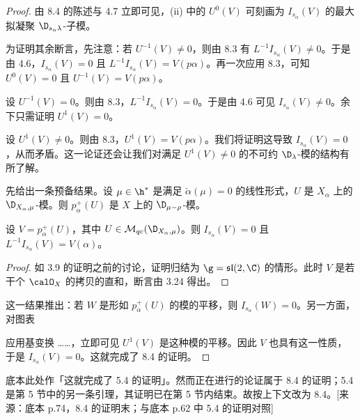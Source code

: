 \begin{proof}
由 8.4 的陈述与 4.7 立即可见，(ii) 中的 $U^0(V)$ 可刻画为 $I_{s_\alpha}(V)$ 的最大拟凝聚 $\D_{s_\alpha\lambda}$-子模。

为证明其余断言，先注意：若 $U^{-1}(V)\ne0$，则由 8.3 有 $L^{-1}I_{s_\alpha}(V)\ne0$。于是由 4.6，$I_{s_\alpha}(V)=0$ 且 $L^{-1}I_{s_\alpha}(V)=V(p\alpha)$。再一次应用 8.3，可知 $U^0(V)=0$ 且 $U^{-1}(V)=V(p\alpha)$。

设 $U^{-1}(V)=0$。则由 8.3，$L^{-1}I_{s_\alpha}(V)=0$。于是由 4.6 可见 $I_{s_\alpha}(V)\ne0$。余下只需证明 $U^1(V)=0$。

设 $U^1(V)\ne0$。则由 8.3，$U^1(V)=V(p\alpha)$。我们将证明这导致 $I_{s_\alpha}(V)=0$，从而矛盾。这一论证还会让我们对满足 $U^1(V)\ne0$ 的不可约 $\D_\lambda$-模的结构有所了解。

先给出一条预备结果。设 $\mu\in\h^*$ 是满足 $\check\alpha(\mu)=0$ 的线性形式，$U$ 是 $X_\alpha$ 上的 $\D_{X_\alpha,\mu}$-模。则 $p_\alpha^+(U)$ 是 $X$ 上的 $\D_{\mu-\rho}$-模。

\begin{lemma}\label{lem:03.8.5}
设 $V=p_\alpha^+(U)$，其中 $U\in\mathcal{M}_{qc}(\D_{X_\alpha,\mu})$。则 $I_{s_\alpha}(V)=0$ 且 $L^{-1}I_{s_\alpha}(V)=V(\alpha)$。
\end{lemma}

\begin{proof}
如 3.9 的证明之前的讨论，证明归结为 $\g=\mathfrak{sl}(2,\C)$ 的情形。此时 $V$ 是若干个 $\calO_X$ 的拷贝的直和，断言由 3.24 得出。
\end{proof}

这一结果推出：若 $W$ 是形如 $p_\alpha^+(U)$ 的模的平移，则 $I_{s_\alpha}(W)=0$。另一方面，对图表
\begin{center}
{\small{}}
\end{center}
应用基变换 ……，立即可见 $U^1(V)$ 是这种模的平移。因此 $V$ 也具有这一性质，于是 $I_{s_\alpha}(V)=0$。这就完成了 8.4 的证明。
\end{proof}

\begin{annote}
底本此处作「这就完成了 5.4 的证明」。然而正在进行的论证属于 8.4 的证明；5.4 是第 5 节中的另一条引理，其证明已在第 5 节内结束。故按上下文改为 8.4。[来源：底本 p.74，8.4 的证明末；与底本 p.62 中 5.4 的证明对照]
\end{annote}

